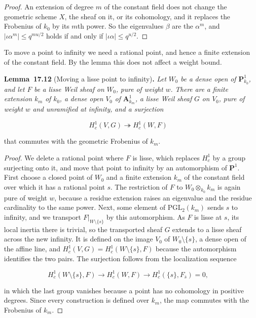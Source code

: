 \documentclass[11pt]{article}
\newenvironment{bpstatement}[2]{\par\addvspace{0.6\baselineskip}\noindent\textbf{#1}#2\textbf{.}\enspace\ignorespaces}
  {\par\addvspace{0.4\baselineskip}}
\newenvironment{bpstatementit}[2]{\begin{bpstatement}{#1}{#2}\itshape\ignorespaces}{\end{bpstatement}}
\begin{document}
\begin{proof}[{Proof}]\label{bp258}%
An extension of degree \(m\) of the constant field does not change the geometric scheme \(X\), the sheaf on it, or its cohomology, and it replaces the Frobenius of \(k_0\) by its \(m\)th power. So the eigenvalues \(\beta\) are the \(\alpha^m\), and \(|\iota\alpha^m|\le q^{mu/2}\) holds if and only if \(|\iota\alpha|\le q^{u/2}\).
\end{proof}

\label{bp259}%
To move a point to infinity we need a rational point, and hence a finite extension of the constant field. By the lemma this does not affect a weight bound.

\label{bp260}%
\begin{bpstatementit}{Lemma~17.12}{ (Moving a lisse point to infinity)}
Let \(W_0\) be a dense open of \(\mathbf P^1_{k_0}\), and let \(F\) be a lisse Weil sheaf on \(W_0\), pure of weight \(w\). There are a finite extension \(k_m\) of \(k_0\), a dense open \(V_0\) of \(\mathbf A^1_{k_m}\), a lisse Weil sheaf \(G\) on \(V_0\), pure of weight \(w\) and unramified at infinity, and a surjection

\[
H_c^1(V,G)\twoheadrightarrow H_c^1(W,F)
\]

that commutes with the geometric Frobenius of \(k_m\).
\end{bpstatementit}

\begin{proof}[{Proof}]\label{bp261}%
We delete a rational point where \(F\) is lisse, which replaces \(H^1_c\) by a group surjecting onto it, and move that point to infinity by an automorphism of \(\mathbf P^1\). First choose a closed point of \(W_0\) and a finite extension \(k_m\) of the constant field over which it has a rational point \(s\). The restriction of \(F\) to \(W_0\otimes_{k_0}k_m\) is again pure of weight \(w\), because a residue extension raises an eigenvalue and the residue cardinality to the same power. Next, some element of \(\mathrm{PGL}_2(k_m)\) sends \(s\) to infinity, and we transport \(F|_{W\setminus\{s\}}\) by this automorphism. As \(F\) is lisse at \(s\), its local inertia there is trivial, so the transported sheaf \(G\) extends to a lisse sheaf across the new infinity. It is defined on the image \(V_0\) of \(W_0\setminus\{s\}\), a dense open of the affine line, and \(H^1_c(V,G)=H^1_c(W\setminus\{s\},F)\) because the automorphism identifies the two pairs. The surjection follows from the localization sequence

\[
H_c^1(W\setminus\{s\},F)\to H_c^1(W,F)\to H_c^1(\{s\},F_{\bar s})=0,
\]

in which the last group vanishes because a point has no cohomology in positive degrees. Since every construction is defined over \(k_m\), the map commutes with the Frobenius of \(k_m\).
\end{proof}
\end{document}
